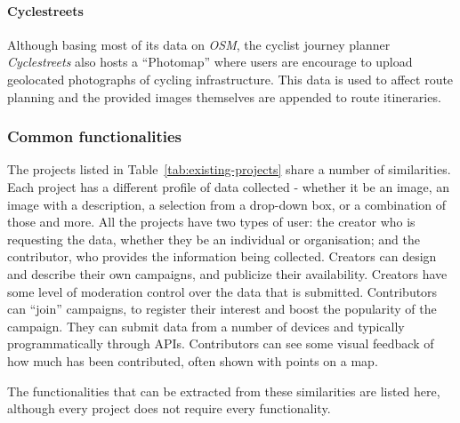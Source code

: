 \documentclass{article}
\begin{document}
		\paragraph{Cyclestreets}
		Although basing most of its data on \emph{OSM}, the cyclist journey planner \emph{Cyclestreets} also hosts a ``Photomap'' where users are encourage to upload geolocated photographs of cycling infrastructure. This data is used to affect route planning and the provided images themselves are appended to route itineraries\cite{_cyclestreets_????}.

		\subsubsection{Common functionalities}
		\label{sec:common-functionalities}

		The projects listed in Table~\ref{tab:existing-projects} share a number of similarities. Each project has a different profile of data collected - whether it be an image, an image with a description, a selection from a drop-down box, or a combination of those and more. All the projects have two types of user: the creator who is requesting the data, whether they be an individual or organisation; and the contributor, who provides the information being collected. Creators can design and describe their own campaigns, and publicize their availability. Creators have some level of moderation control over the data that is submitted. Contributors can ``join'' campaigns, to register their interest and boost the popularity of the campaign. They can submit data from a number of devices and typically programmatically through APIs. Contributors can see some visual feedback of how much has been contributed, often shown with points on a map.

		The functionalities that can be extracted from these similarities are listed here, although every project does not require every functionality.
\end{document}
